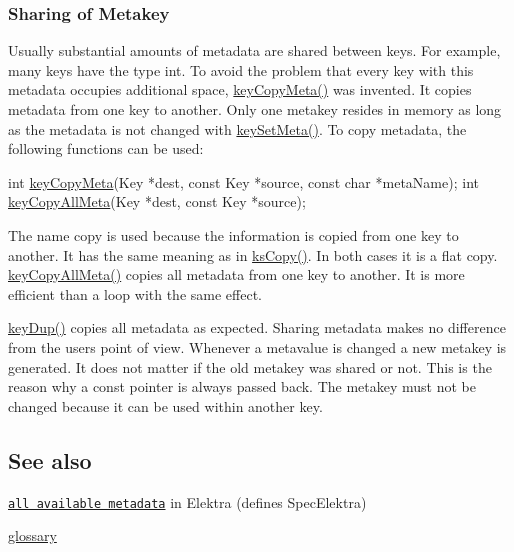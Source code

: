 \subsubsection*{Sharing of Metakey}

Usually substantial amounts of metadata are shared between keys. For example, many keys have the type {\ttfamily int}. To avoid the problem that every key with this metadata occupies additional space, {\ttfamily \hyperlink{group__keymeta_ga9a22b992478e613c8788bd460b4a1f0c}{key\+Copy\+Meta()}} was invented. It copies metadata from one key to another. Only one metakey resides in memory as long as the metadata is not changed with {\ttfamily \hyperlink{group__keymeta_gae1f15546b234ffb6007d8a31178652b9}{key\+Set\+Meta()}}. To copy metadata, the following functions can be used\+:


\begin{DoxyCode}
\textcolor{keywordtype}{int} \hyperlink{group__keymeta_ga9a22b992478e613c8788bd460b4a1f0c}{keyCopyMeta}(Key *dest, \textcolor{keyword}{const} Key *source, \textcolor{keyword}{const} \textcolor{keywordtype}{char} *metaName);
\textcolor{keywordtype}{int} \hyperlink{group__keymeta_ga8e63720a65610a29597494d0671f9401}{keyCopyAllMeta}(Key *dest, \textcolor{keyword}{const} Key *source);
\end{DoxyCode}


The name {\ttfamily copy} is used because the information is copied from one key to another. It has the same meaning as in {\ttfamily \hyperlink{group__keyset_gaba1f1dbea191f4d7e7eb3e4296ae7d5e}{ks\+Copy()}}. In both cases it is a flat copy. {\ttfamily \hyperlink{group__keymeta_ga8e63720a65610a29597494d0671f9401}{key\+Copy\+All\+Meta()}} copies all metadata from one key to another. It is more efficient than a loop with the same effect.

{\ttfamily \hyperlink{group__key_gae6ec6a60cc4b8c1463fa08623d056ce3}{key\+Dup()}} copies all metadata as expected. Sharing metadata makes no difference from the user\textquotesingle{}s point of view. Whenever a metavalue is changed a new metakey is generated. It does not matter if the old metakey was shared or not. This is the reason why a const pointer is always passed back. The metakey must not be changed because it can be used within another key.

\subsection*{See also}


\begin{DoxyItemize}
\item \href{/home/markus/Projekte/Elektra/current/doc/METADATA.ini}{\tt all available metadata} in Elektra (defines Spec\+Elektra)
\item \hyperlink{md_doc_help_elektra-glossary_doc_help_elektra-glossary_md}{glossary} 
\end{DoxyItemize}